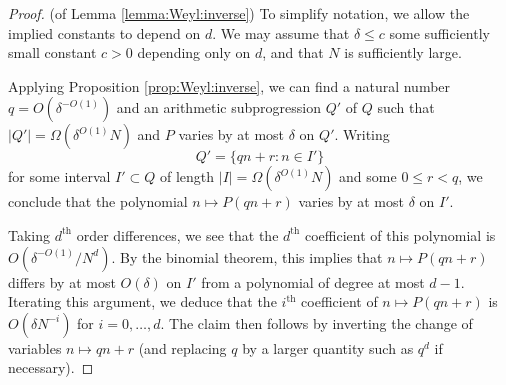 \documentclass[reqno]{amsart}
\theoremstyle{plain}
\theoremstyle{definition}
\begin{document}
\begin{proof}(of Lemma \ref{lemma:Weyl:inverse})
To simplify notation, we allow the implied constants to depend on $d$. We may assume that $\delta \leq c$ some sufficiently small constant $c>0$ depending only on $d$, and that $N$ is sufficiently large.

Applying Proposition \ref{prop:Weyl:inverse}, we can find a natural number $q = O(\delta^{-O(1)})$ and an arithmetic subprogression $Q'$ of $Q$ such that $|Q'| = \Omega(\delta^{O(1)}N)$ and $P$ varies by at most $\delta$ on $Q'$. Writing 
\[
Q' = \{ qn+r: n \in I'\}
\]
for some interval $I' \subset Q$ of length $|I|=\Omega(\delta^{O(1)} N)$ and some $0 \leq r < q$, we conclude that the polynomial $n \mapsto P(qn+r)$ varies by at most $\delta$ on $I'$. 

Taking $d^{\text{th}}$ order differences, we see that the $d^{\text{th}}$ coefficient of this polynomial is $O(\delta^{-O(1)} / N^d)$. By the binomial theorem, this implies that $n \mapsto P(qn+r)$ differs by at most $O(\delta)$ on $I'$ from a polynomial of degree at most $d-1$. Iterating this argument, we deduce that the $i^{\text{th}}$ coefficient of $n \mapsto P(qn+r)$ is $O(\delta N^{-i})$ for $i=0,\dots,d$. The claim then follows by inverting the change of variables $n \mapsto qn+r$ (and replacing $q$ by a larger quantity such as $q^d$ if necessary).
\end{proof}
\end{document}
